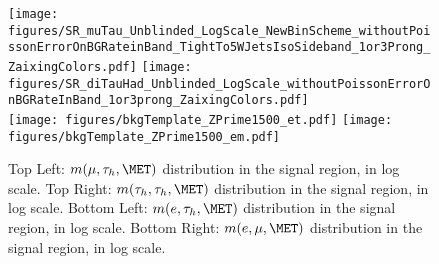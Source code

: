\begin{figure}[tbh!]
  \centering
   \texttt{[image: figures/SR\_muTau\_Unblinded\_LogScale\_NewBinScheme\_withoutPoissonErrorOnBGRateinBand\_TightTo5WJetsIsoSideband\_1or3Prong\_ZaixingColors.pdf]}
   \texttt{[image: figures/SR\_diTauHad\_Unblinded\_LogScale\_withoutPoissonErrorOnBGRateInBand\_1or3prong\_ZaixingColors.pdf]} \\
   \texttt{[image: figures/bkgTemplate\_ZPrime1500\_et.pdf]}
   \texttt{[image: figures/bkgTemplate\_ZPrime1500\_em.pdf]}
  \caption{ Top Left: $m(\mu,\tau_{h},\MET)$ distribution in the signal region, in log scale.  Top Right: $m(\tau_{h},\tau_{h},\MET)$ distribution in 
the signal region, in log scale.  Bottom Left: $m(e,\tau_{h},\MET)$ distribution in the signal region, in log scale.  Bottom Right: $m(e,\mu,\MET)$ 
distribution in the signal region, in log scale.}
    \label{fig:SignalRegionPlot_a}
\end{figure}

